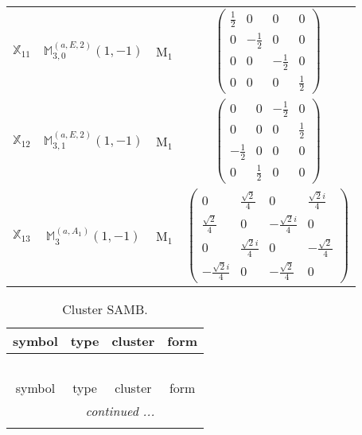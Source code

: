 \documentclass[fleqn,10pt,landscape]{article}
\begin{document}
\begin{itemize}
\begin{center}
\begin{longtable}{c|c|c|c}
$ \mathbb{X}_{11} $ & $\mathbb{M}_{3,0}^{(a,E,2)}(1,-1)$ & M$_{1}$ & $\begin{pmatrix} \frac{1}{2} & 0 & 0 & 0 \\ 0 & - \frac{1}{2} & 0 & 0 \\ 0 & 0 & - \frac{1}{2} & 0 \\ 0 & 0 & 0 & \frac{1}{2} \end{pmatrix}$ \\
$ \mathbb{X}_{12} $ & $\mathbb{M}_{3,1}^{(a,E,2)}(1,-1)$ & M$_{1}$ & $\begin{pmatrix} 0 & 0 & - \frac{1}{2} & 0 \\ 0 & 0 & 0 & \frac{1}{2} \\ - \frac{1}{2} & 0 & 0 & 0 \\ 0 & \frac{1}{2} & 0 & 0 \end{pmatrix}$ \\
$ \mathbb{X}_{13} $ & $\mathbb{M}_{3}^{(a,A_{1})}(1,-1)$ & M$_{1}$ & $\begin{pmatrix} 0 & \frac{\sqrt{2}}{4} & 0 & \frac{\sqrt{2} i}{4} \\ \frac{\sqrt{2}}{4} & 0 & - \frac{\sqrt{2} i}{4} & 0 \\ 0 & \frac{\sqrt{2} i}{4} & 0 & - \frac{\sqrt{2}}{4} \\ - \frac{\sqrt{2} i}{4} & 0 & - \frac{\sqrt{2}}{4} & 0 \end{pmatrix}$ \\
\end{longtable}
\end{center}
\begin{center}
\renewcommand{\arraystretch}{1.3}
\begin{longtable}{c|c|c|c}
\caption{Cluster SAMB.}
 \\
 \hline \hline
symbol & type & cluster & form \\ \hline \endfirsthead

\multicolumn{3}{l}{\tablename\ \thetable{}} \\
 \hline \hline
symbol & type & cluster & form \\ \hline \endhead

 \hline \hline
\multicolumn{3}{r}{\footnotesize\it continued ...} \\ \endfoot


\end{longtable}
\end{center}
\end{itemize}
\end{document}
